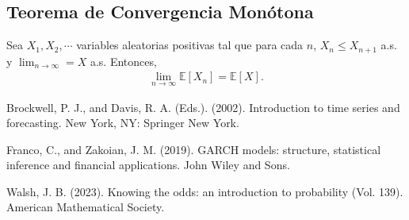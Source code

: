 \documentclass[a4paper, 11pt]{article}
\begin{document}
\subsection{Teorema de Convergencia Monótona}

Sea $X_1,X_2,\cdots$ variables aleatorias positivas tal que para cada $n$, $X_n \leq X_{n+1}$ a.s. y $\lim_{n\rightarrow \infty} = X $ a.s. Entonces,
\begin{align*}
  \lim_{n\rightarrow \infty } \mathbb{E}\left [X_n \right ] = \mathbb{E}\left [X \right ].
\end{align*}






\newpage




\begin{thebibliography}{9}


  Brockwell, P. J., and Davis, R. A. (Eds.). (2002). Introduction to time series and forecasting. New York, NY: Springer New York.

  Franco, C., and Zakoian, J. M. (2019). GARCH models: structure, statistical inference and financial applications. John Wiley and Sons.
  
  Walsh, J. B. (2023). Knowing the odds: an introduction to probability (Vol. 139). American Mathematical Society.
  
  \end{thebibliography}
\end{document}
